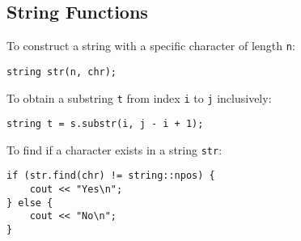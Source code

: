 \subsection{String Functions}

To construct a string with a specific character of length \texttt{n}:
\begin{lstlisting}
string str(n, chr);
\end{lstlisting}

To obtain a substring \texttt{t} from index \texttt{i} to \texttt{j} inclusively:
\begin{lstlisting}
string t = s.substr(i, j - i + 1);
\end{lstlisting}

To find if a character exists in a string \texttt{str}:
\begin{lstlisting}
if (str.find(chr) != string::npos) {
    cout << "Yes\n";
} else {
    cout << "No\n";
}
\end{lstlisting}
